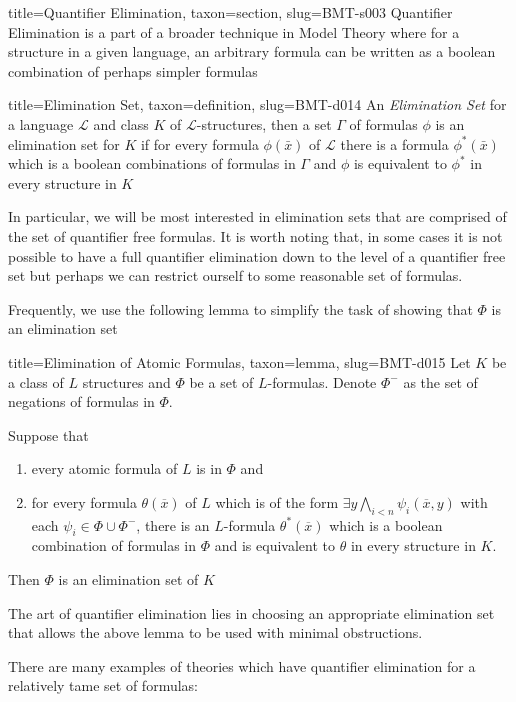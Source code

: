 \documentclass[a4paper]{article}
\begin{document}
\begin{tree}{title={Quantifier Elimination}, taxon={section}, slug={BMT-s003}}
Quantifier Elimination is a part of a broader technique in Model Theory where for a structure in a given language, an arbitrary formula can be written as a boolean combination of perhaps simpler formulas
\begin{tree}{title={Elimination Set}, taxon={definition}, slug={BMT-d014}}
An \emph{Elimination Set} for a language \(\mathcal {L}\) and class \(K\) of \(\mathcal {L}\)-structures, then a set \(\Gamma\) of formulas \(\phi\) is an elimination set for \(K\) if for every formula \(\phi ( \bar {x})\) of \(\mathcal {L}\) there is a formula \(\phi ^*( \bar {x})\) which is a boolean combinations of formulas in \(\Gamma\) and \(\phi\) is equivalent to \(\phi ^*\) in every structure in \(K\)
\end{tree}
\par{In particular, we will be most interested in elimination sets that are comprised of the set of quantifier free formulas. It is worth noting that, in some cases it is not possible to have a full quantifier elimination down to the level of a quantifier free set but perhaps we can restrict ourself to some reasonable set of formulas.}\par{Frequently, we use the following lemma to simplify the task of showing that \(\Phi\) is an elimination set}
\begin{tree}{title={Elimination of Atomic Formulas}, taxon={lemma}, slug={BMT-d015}}
Let \(K\) be a class of \(L\) structures and \(\Phi\) be a set of \(L\)-formulas. Denote \(\Phi ^-\) as the set of negations of formulas in \(\Phi\).\par{Suppose that 
  \begin{enumerate}
\item{every atomic formula of \(L\) is in \(\Phi\) and} 
    \item{for every formula \(\theta ( \overline {x})\) of \(L\) which is of the form \(\exists  y  \bigwedge _{i<n}  \psi _i ( \overline {x},y)\) with each \(\psi _i  \in   \Phi \cup   \Phi ^-\), there is an \(L\)-formula \(\theta ^*( \overline {x})\) which is a boolean combination of formulas in \(\Phi\) and is equivalent to \(\theta\) in every structure in \(K\).}
\end{enumerate}
  Then \(\Phi\) is an elimination set of \(K\)}
\end{tree}
\par{The art of quantifier elimination lies in choosing an appropriate elimination set that allows the above lemma to be used with minimal obstructions. }\par{There are many examples of theories which have quantifier elimination for a relatively tame set of formulas: }
  

\end{tree}
\end{document}
